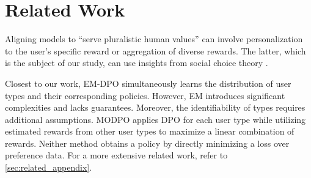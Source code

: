 \section{Related Work}
\label{sec:related}

Aligning models to ``serve pluralistic human values'' \citep{sorensen_roadmap_2024} can involve personalization to the user's specific reward \citep{poddar_personalizing_2024,chen_pal_2024} or aggregation of diverse rewards. The latter, which is the subject of our study, can use insights from social choice theory \citep{ge2024axioms,conitzer2024social}.

Closest to our work, EM-DPO \citep{chidambaram2024direct} simultaneously learns the distribution of user types and their corresponding policies. However, EM introduces significant complexities and lacks guarantees. Moreover, the identifiability of types requires additional assumptions. MODPO \citep{zhou_beyond_2024} applies DPO for each user type while utilizing estimated rewards from other user types to maximize a linear combination of rewards. Neither method obtains a policy by directly minimizing a loss over preference data. For a more extensive related work, refer to \cref{sec:related_appendix}.





